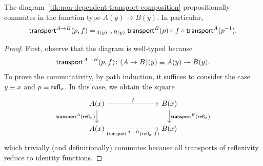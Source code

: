 \begin{prop}\label{prop:non-dependent-transport-composition}
    The diagram~\eqref{tik:non-dependent-transport-composition} propositionally commutes in the function type\/ $A(y)\to B(y)$. In particular,
    \[
        \mathsf{transport}^{A\to B}(p,f)
            \mathrel{=_{A(y)\to B(y)}}
            \mathsf{transport}^B(p)
                \circ f
                \circ 
                \mathsf{transport}^A(p^{-1}).
    \]
\end{prop}

\begin{proof}
    First, observe that the diagram is well-typed because
    \[
        \fun{transport}^{A\to B}(p,f)\colon (A\to B)(y) \equiv A(y)\to B(y).
    \]
    To prove the commutativity, by path induction, it suffices to consider the case\/ $y\equiv x$ and\/ $p\equiv\mathsf{refl}_x$. In this case, we obtain the square
    \[
        \begin{tikzcd}[column sep=2.5cm]
            A(x) 
                \arrow[r, "f"] 
                \arrow[d, "{\fun{transport}^A(\fun{refl}_x)}"'] 
            & B(x) 
                \arrow[d, "{\fun{transport}^B(\fun{refl}_x)}"] 
            \\
            A(x) 
                \arrow[r, "{\fun{transport}^{A\to B}(\fun{refl}_x, f)}"'] 
            & B(x)
        \end{tikzcd}
    \]
    which trivially (and definitionally) commutes because all transports of reflexivity reduce to identity functions.
\end{proof}

